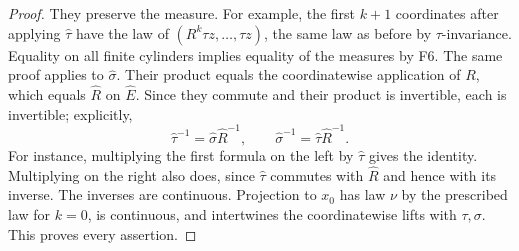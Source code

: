 \documentclass[11pt]{article}
\theoremstyle{remark}\newtheorem{remark}[theorem]{Remark}
\begin{document}
\begin{proof}
They preserve the measure. For example, the first $k+1$ coordinates after applying $\widehat\tau$ have the law of $(R^k\tau z,\ldots,\tau z)$, the same law as before by $\tau$-invariance. Equality on all finite cylinders implies equality of the measures by F6. The same proof applies to $\widehat\sigma$. Their product equals the coordinatewise application of $R$, which equals $\widehat R$ on $\widehat E$. Since they commute and their product is invertible, each is invertible; explicitly,
\[
 \widehat\tau^{-1}=\widehat\sigma\widehat R^{-1},\qquad
 \widehat\sigma^{-1}=\widehat\tau\widehat R^{-1}.
\]
For instance, multiplying the first formula on the left by $\widehat\tau$ gives the identity. Multiplying on the right also does, since $\widehat\tau$ commutes with $\widehat R$ and hence with its inverse. The inverses are continuous. Projection to $x_0$ has law $\nu$ by the prescribed law for $k=0$, is continuous, and intertwines the coordinatewise lifts with $\tau,\sigma$. This proves every assertion.
\end{proof}
\end{document}
